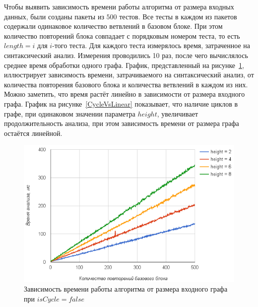 Чтобы выявить зависимость времени работы алгоритма от размера входных данных, были созданы пакеты из $500$ тестов. Все тесты в каждом из пакетов содержали одинаковое количество ветвлений в базовом блоке. 
При этом количество повторений блока совпадает с порядковым номером теста, то есть $length=i$ для $i$-того теста. Для каждого теста измерялось время, затраченное на синтаксический анализ. Измерения проводились 
10 раз, после чего вычислялось среднее время обработки одного графа. График, представленный на рисунке~\ref{diffheights}, иллюстрирует зависимость времени, затрачиваемого на синтаксический анализ, от количества повторения базового блока и 
количества ветвлений в каждом из них. Можно заметить, что время растёт линейно в зависимости от размера входного графа. График на рисунке~\ref{CycleVsLinear} показывает, что 
наличие циклов в графе, при одинаковом значении параметра $height$, увеличивает продолжительность анализа, при этом зависимость времени от размера графа остаётся линейной.

\begin{figure}[h!]
 \centering
 \includegraphics[width=15cm]{pics/diffheights.png}
 \caption{Зависимость времени работы алгоритма от размера входного графа при $isCycle=false$}
 \label{diffheights}
\end{figure}

